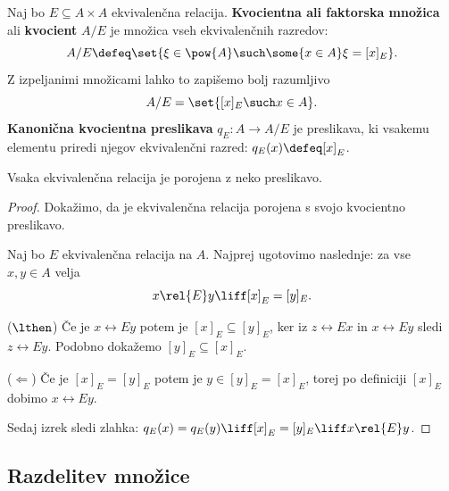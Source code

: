 \begin{definicija}
  Naj bo $E \subseteq A \times A$ ekvivalenčna relacija. \textbf{Kvocientna ali faktorska množica} ali \textbf{kvocient} $A/E$ je množica vseh ekvivalenčnih razredov:
  \begin{equation*}
    A/E \defeq \set{ \xi \in \pow{A} \such \some{x \in A} \xi = [x]_E }.
  \end{equation*}
  Z izpeljanimi množicami lahko to zapišemo bolj razumljivo
  \begin{equation*}
    A/E = \set{ [x]_E \such x \in A }.
  \end{equation*}
  \textbf{Kanonična kvocientna preslikava} $q_E : A \to A/E$ je preslikava, ki vsakemu elementu
  priredi njegov ekvivalenčni razred: $q_E(x) \defeq [x]_E$.
\end{definicija}

\begin{izrek}
  Vsaka ekvivalenčna relacija je porojena z neko preslikavo.
\end{izrek}

\begin{proof}
  Dokažimo, da je ekvivalenčna relacija porojena s svojo kvocientno preslikavo.

  Naj bo $E$ ekvivalenčna relacija na $A$. Najprej ugotovimo naslednje: za vse $x,
  y \in A$ velja
  \begin{equation*}
    x \rel{E} y \liff [x]_E = [y]_E.
  \end{equation*}

  ($\lthen$) Če je $x \rel{E} y$ potem je $[x]_E \subseteq [y]_E$, ker iz $z \rel{E} x$ in $x \rel{E} y$ sledi $z \rel{E} y$.
  Podobno dokažemo $[y]_E \subseteq [x]_E$.

  ($\Leftarrow$) Če je $[x]_E = [y]_E$ potem je $y \in [y]_E = [x]_E$, torej po definiciji $[x]_E$
  dobimo $x \rel{E} y$.

  Sedaj izrek sledi zlahka: $q_E(x) = q_E(y) \liff [x]_E = [y]_E \liff x \rel{E} y$.
\end{proof}


\subsection{Razdelitev množice}

